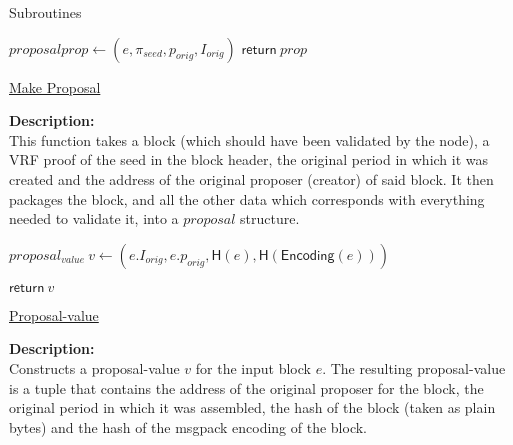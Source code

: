 \documentclass[10pt,a4paper]{article}
\begin{document}
\begin{section}{Subroutines}
\begin{algorithm}[H]
    \begin{algorithmic}[1]

    \State $proposal prop \gets (e, \pi_{seed}, p_{orig}, I_{orig})$
    \State $\mathsf{return} \ prop$

    

    \EndFunction
    \end{algorithmic}
    \caption{\underline{Make Proposal}}
\end{algorithm}


\noindent \textbf{Description:}\\ This function takes a block (which should have been validated by the node),
a VRF proof of the seed in the block header, the original period in which it was created and the address of the
original proposer (creator) of said block. It then packages the block, and all the other data which corresponds
with everything needed to validate it, into a $proposal$ structure.

\begin{algorithm}[H]\label{proposal-value}
    \begin{algorithmic}[1]

    \State $proposal_{value} \ v \gets (e.I_{orig}, e.p_{orig}, \mathsf{H}(e), \mathsf{H}(\mathsf{Encoding}(e)))$

    \State $\mathsf{return} \ v$

    \EndFunction
    \end{algorithmic}
    \caption{\underline{Proposal-value}}
\end{algorithm}

\noindent \textbf{Description:}\\ Constructs a proposal-value $v$ for the input block $e$.
The resulting proposal-value is a tuple that contains the address of the original proposer for
the block, the original period in which it was assembled, the hash of the block (taken as plain bytes) 
and the hash of the msgpack encoding of the block.


\end{section}
\end{document}
